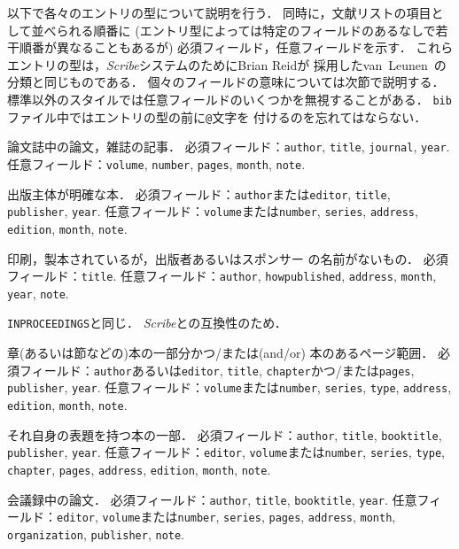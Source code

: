 以下で各々のエントリの型について説明を行う．
同時に，文献リストの項目として並べられる順番に
(エントリ型によっては特定のフィールドのあるなしで若干順番が異なることもあるが)
必須フィールド，任意フィールドを示す．
これらエントリの型は，{\em Scribe}システムのためにBrian Reidが
採用したvan~Leunen~\cite{van-leunen}の分類と同じものである．
個々のフィールドの意味については次節で説明する．
標準以外のスタイルでは任意フィールドのいくつかを無視することがある．
{\tt bib}ファイル中ではエントリの型の前に{\tt @}文字を
付けるのを忘れてはならない．


\begin{description}
\sloppy

\item[article\hfill] 論文誌中の論文，雑誌の記事．
必須フィールド：{\tt author}, {\tt title}, {\tt journal},
{\tt year}.
任意フィールド：{\tt volume}, {\tt number},
{\tt pages}, {\tt month}, {\tt note}.

\item[book\hfill] 出版主体が明確な本．
必須フィールド：{\tt author}または{\tt editor},
{\tt title}, {\tt publisher}, {\tt year}.
任意フィールド：{\tt volume}または{\tt number}, {\tt series},
{\tt address}, {\tt edition}, {\tt month},
{\tt note}.

\item[booklet\hfill] 印刷，製本されているが，出版者あるいはスポンサー
の名前がないもの．
必須フィールド：{\tt title}.
任意フィールド：{\tt author}, {\tt howpublished},
{\tt address}, {\tt month}, {\tt year}, {\tt note}.

\item[conference\hfill] {\tt INPROCEEDINGS}と同じ．
{\em Scribe\/}との互換性のため．

\item[inbook\hfill] 章(あるいは節などの)本の一部分かつ/または(and/or)
本のあるページ範囲．
必須フィールド：{\tt author}あるいは{\tt editor}, {\tt title},
{\tt chapter}かつ/または{\tt pages}, {\tt publisher},
{\tt year}.
任意フィールド：{\tt volume}または{\tt number}, {\tt series},
{\tt type}, {\tt address},
{\tt edition}, {\tt month}, {\tt note}.

\item[incollection\hfill] それ自身の表題を持つ本の一部．
必須フィールド：{\tt author}, {\tt title}, {\tt booktitle},
{\tt publisher}, {\tt year}.
任意フィールド：{\tt editor}, {\tt volume}または{\tt number},
{\tt series}, {\tt type}, {\tt chapter}, {\tt pages},
{\tt address}, {\tt edition}, {\tt month}, {\tt note}.

\item[inproceedings\hfill] 会議録中の論文．
必須フィールド：{\tt author}, {\tt title}, {\tt booktitle},
{\tt year}.
任意フィールド：{\tt editor}, {\tt volume}または{\tt number},
{\tt series}, {\tt pages}, {\tt address}, {\tt month},
{\tt organization}, {\tt publisher}, {\tt note}.


\end{description}
